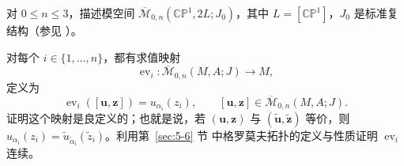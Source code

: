 \begin{exercise}\label{ex:5-1-10}
对 $0\le n\le3$，描述模空间
$\overline{\mathcal M}_{0,n}(\mathbb{CP}^1,2L;J_0)$，其中
$L=[\mathbb{CP}^1]$，$J_0$ 是标准复结构（参见 ）。
\end{exercise}

\begin{exercise}\label{ex:5-1-11}
对每个 $i\in\{1,\ldots,n\}$，都有求值映射
\[
  \operatorname{ev}_i:\overline{\mathcal M}_{0,n}(M,A;J)\longrightarrow M,
\]
定义为
\begin{equation}\label{eq:5-1-7}
  \operatorname{ev}_i([\mathbf u,\mathbf z])=u_{\alpha_i}(z_i),
  \qquad [\mathbf u,\mathbf z]\in\overline{\mathcal M}_{0,n}(M,A;J).
\end{equation}
证明这个映射是良定义的；也就是说，若 $(\mathbf u,\mathbf z)$ 与
$(\widetilde{\mathbf u},\widetilde{\mathbf z})$ 等价，则
$u_{\alpha_i}(z_i)=\widetilde u_{\widetilde\alpha_i}(\widetilde z_i)$。利用第~\ref{sec:5-6} 节
中格罗莫夫拓扑的定义与性质证明 $\operatorname{ev}_i$ 连续。
\end{exercise}
